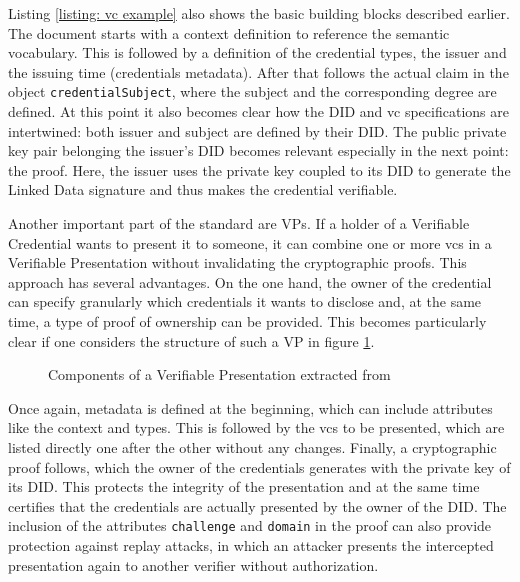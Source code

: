 	   Listing \ref{listing: vc example} also shows the basic building blocks described earlier. The document starts with a context definition to reference the semantic vocabulary. This is followed by a definition of the credential types, the issuer and the issuing time (credentials metadata). After that follows the actual claim in the object \texttt{credentialSubject}, where the subject and the corresponding degree are defined. At this point it also becomes clear how the \ac{DID} and \ac{vc} specifications are intertwined: both issuer and subject are defined by their \ac{DID}.  The public private key pair belonging the issuer's \ac{DID} becomes relevant especially in the next point: the proof. Here, the issuer uses the private key coupled to its \ac{DID} to generate the Linked Data signature and thus makes the credential verifiable.
	   
	   Another important part of the standard are \acfp{VP}. If a holder of a Verifiable Credential wants to present it to someone, it can combine one or more \acp{vc} in a Verifiable Presentation without invalidating the cryptographic proofs. This approach has several advantages. On the one hand, the owner of the credential can specify granularly which credentials it wants to disclose and, at the same time, a type of proof of ownership can be provided. This becomes particularly clear if one considers the structure of such a \ac{VP} in figure \ref{figure: vp components}. \cite{sporny_verifiable_2019}
	   
	   \begin{figure}[ht]
    	    \centering
    	    \makebox[\textwidth]{}
            \caption[Components of a Verifiable Presentation]{Components of a Verifiable Presentation extracted from \cite{sporny_verifiable_2019}}
            \label{figure: vp components}
        \end{figure}
        
        Once again, metadata is defined at the beginning, which can include attributes like the context and types. This is followed by the \acp{vc} to be presented, which are listed directly one after the other without any changes. Finally, a cryptographic proof follows, which the owner of the credentials generates with the private key of its \ac{DID}. This protects the integrity of the presentation and at the same time certifies that the credentials are actually presented by the owner of the \ac{DID}. The inclusion of the attributes \texttt{challenge} and \texttt{domain} in the proof can also provide protection against replay attacks, in which an attacker presents the intercepted presentation again to another verifier without authorization. \cite{sporny_verifiable_2019}
        
